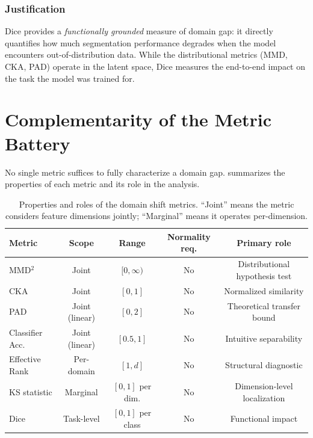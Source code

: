 \documentclass[11pt,a4paper]{article}
\theoremstyle{definition}
\begin{document}
\subsubsection{Justification}

Dice provides a \emph{functionally grounded} measure of domain gap: it directly quantifies how much segmentation performance degrades when the model encounters out-of-distribution data. While the distributional metrics (MMD, CKA, PAD) operate in the latent space, Dice measures the end-to-end impact on the task the model was trained for.


\section{Complementarity of the Metric Battery}\label{sec:complementarity}

No single metric suffices to fully characterize a domain gap.  summarizes the properties of each metric and its role in the analysis.

\begin{table}[h]
  \centering
  \caption{Properties and roles of the domain shift metrics. ``Joint'' means the metric considers feature dimensions jointly; ``Marginal'' means it operates per-dimension.}
  \label{tab:metric-properties}
  \begin{tabular}{lcccc}
    \toprule
    Metric & Scope & Range & Normality req. & Primary role \\
    \midrule
    MMD$^2$ & Joint & $[0, \infty)$ & No & Distributional hypothesis test \\
    CKA & Joint & $[0, 1]$ & No & Normalized similarity \\
    PAD & Joint (linear) & $[0, 2]$ & No & Theoretical transfer bound \\
    Classifier Acc. & Joint (linear) & $[0.5, 1]$ & No & Intuitive separability \\
    Effective Rank & Per-domain & $[1, d]$ & No & Structural diagnostic \\
    KS statistic & Marginal & $[0, 1]$ per dim. & No & Dimension-level localization \\
    Dice & Task-level & $[0, 1]$ per class & No & Functional impact \\
    \bottomrule
  \end{tabular}
\end{table}
\end{document}
